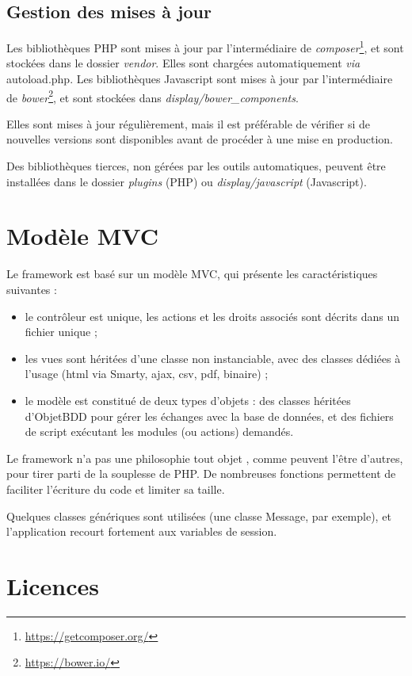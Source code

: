 \subsection{Gestion des mises à jour}
Les bibliothèques PHP sont mises à jour par l'intermédiaire de \textit{composer}\footnote{\href{https://getcomposer.org/}{https://getcomposer.org/}}, et sont stockées dans le dossier \textit{vendor}. Elles sont chargées automatiquement \textit{via} autoload.php.
Les bibliothèques Javascript sont mises à jour par l'intermédiaire de \textit{bower}\footnote{\href{https://bower.io/}{https://bower.io/}}, et sont stockées dans \textit{display/bower\_components}.

Elles sont mises à jour régulièrement, mais il est préférable de vérifier si de nouvelles versions sont disponibles avant de procéder à une mise en production.

Des bibliothèques tierces, non gérées par les outils automatiques, peuvent être installées dans le dossier \textit{plugins} (PHP) ou \textit{display/javascript} (Javascript).

\section{Modèle MVC}

Le framework est basé sur un modèle MVC, qui présente les caractéristiques suivantes :
\begin{itemize}
\item le contrôleur est unique, les actions et les droits associés sont décrits dans un fichier unique ;
\item les vues sont héritées d'une classe non instanciable, avec des classes dédiées à l'usage (html via Smarty, ajax, csv, pdf, binaire) ;
\item le modèle est constitué de deux types d'objets : des classes héritées d'ObjetBDD pour gérer les échanges avec la base de données, et des fichiers de script exécutant les modules (ou actions) demandés.
\end{itemize}

Le framework n'a pas une philosophie \og tout objet \fg{}, comme peuvent l'être d'autres, pour tirer parti de la souplesse de PHP. De nombreuses fonctions permettent de faciliter l'écriture du code et limiter sa taille.

Quelques classes génériques sont utilisées (une classe Message, par exemple), et l'application recourt fortement aux variables de session. 

\section{Licences}


